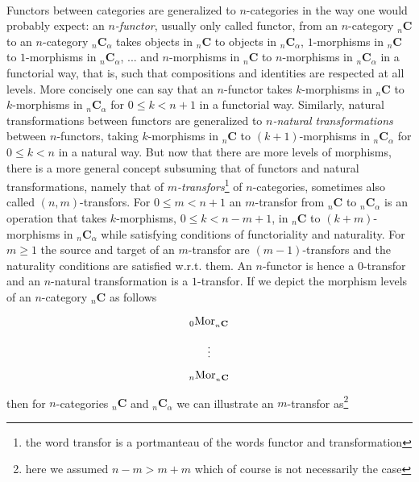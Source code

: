 \\
Functors between categories are generalized to $n$-categories in the way one would probably expect: an \textit{$n$-functor}, usually only called functor, from an $n$-category ${_{n}}\mathbf{C}$ to an $n$-category ${_{n}}\mathbf{C}_{\alpha}$ takes objects in ${_{n}}\mathbf{C}$ to objects in ${_{n}}\mathbf{C}_{\alpha}$, $1$-morphisms in ${_{n}}\mathbf{C}$ to $1$-morphisms in ${_{n}}\mathbf{C}_{\alpha}$, ... and $n$-morphisms in ${_{n}}\mathbf{C}$ to $n$-morphisms in ${_{n}}\mathbf{C}_{\alpha}$ in a functorial way, that is, such that compositions and identities are respected at all levels. More concisely one can say that an $n$-functor takes $k$-morphisms in ${_{n}}\mathbf{C}$ to $k$-morphisms in ${_{n}}\mathbf{C}_{\alpha}$ for $0 \leq k < n+1$ in a functorial way. Similarly, natural transformations between functors are generalized to \textit{$n$-natural transformations} between $n$-functors, taking $k$-morphisms in ${_{n}}\mathbf{C}$ to $(k+1)$-morphisms in ${_{n}}\mathbf{C}_{\alpha}$ for $0 \leq k < n$ in a natural way. But now that there are more levels of morphisms, there is a more general concept subsuming that of functors and natural transformations, namely that of \textit{$m$-transfors}\footnote{the word transfor is a portmanteau of the words functor and transformation} of $n$-categories, sometimes also called $(n,m)$-transfors. For $0 \leq m < n+1$ an $m$-transfor from ${_{n}}\mathbf{C}$ to ${_{n}}\mathbf{C}_{\alpha}$ is an operation that takes $k$-morphisms, $0 \leq k < n-m+1$, in ${_{n}}\mathbf{C}$ to $(k+m)$-morphisms in ${_{n}}\mathbf{C}_{\alpha}$ while satisfying conditions of functoriality and naturality. For $m \geq 1$ the source and target of an $m$-transfor are $(m-1)$-transfors and the naturality conditions are satisfied w.r.t. them. An $n$-functor is hence a $0$-transfor and an $n$-natural transformation is a $1$-transfor. If we depict the morphism levels of an $n$-category ${_{n}}\mathbf{C}$ as follows
\begin{equation*}
\begin{tikzcd}[sep=tiny]
  {_{0}}\mathrm{Mor}_{{_{n}}\mathbf{C}}
  \\
  \vdots
  \\
  {_{n}}\mathrm{Mor}_{{_{n}}\mathbf{C}}
\end{tikzcd}
\end{equation*}
then for $n$-categories ${_{n}}\mathbf{C}$ and ${_{n}}\mathbf{C}_{\alpha}$ we can illustrate an $m$-transfor as\footnote{here we assumed $n-m > m+m$ which of course is not necessarily the case}
